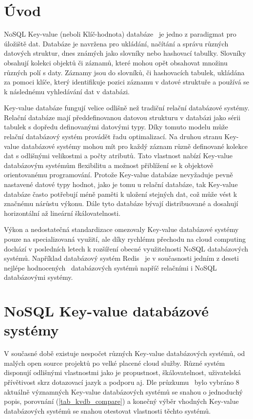 \documentclass[czech,master,dept460,male,csharp,cpdeclaration]{diploma}
\begin{document}
	
	\MakeTitlePages
	
	\chapter{Úvod}
	
	NoSQL Key-value (neboli Klíč-hodnota) databáze~\cite{wiki-key-value-db, ytb-nosql-db} je jedno z paradigmat pro úložiště dat. Databáze je navržena pro ukládání, načítání a správu různých datových struktur, dnes známých jako slovníky nebo hashovací tabulky. Slovníky obsahují kolekci objektů či záznamů, které mohou opět obsahovat množinu různých polí s daty. Záznamy jsou do slovníků, či hashovacích tabulek, ukládána za pomoci klíče, který identifikuje pozici záznamu v datové struktuře a používá se k následnému vyhledávání dat v databázi.
	
	Key-value databáze fungují velice odlišně než tradiční relační databázové systémy. Relační databáze mají předdefinovanou datovou strukturu v databázi jako sérii tabulek s dopředu definovanými datovými typy. Díky tomuto modelu může relační databázový systém provádět řadu optimalizací. Na druhou stranu Key-value databázové systémy mohou mít pro každý záznam různě definované kolekce dat s odlišnými velikostmi a počty atributů. Tato vlastnost nabízí Key-value databázovým systémům flexibilitu a možnost přiblížení se k objektově orientovanému programování. Protože Key-value databáze nevyžaduje pevně nastavené datové typy hodnot, jako je tomu u relační databáze, tak Key-value databáze často potřebují méně paměti k uložení stejných dat, což může vést k značnému nárůstu výkonu. Dále tyto databáze bývají distribuované a dosahují horizontální až lineární škálovatelnosti.
	
	Výkon a nedostatečná standardizace omezovaly Key-value databázové systémy pouze na specializovaná využití, ale díky rychlému přechodu na cloud computing dochází v posledních letech k rozšíření obecné využitelnosti NoSQL databázových systémů. Například databázový systém Redis~\cite{redis} je v současnosti jedním z deseti nejlépe hodnocených~\cite{db-engineers-ranking} databázových systémů napříč relačními i NoSQL databázovými systémy.
	
	\chapter{NoSQL Key-value databázové systémy}
	\label{chapter:no-sql-ky-sys}
	
	V současné době existuje nespočet různých Key-value databázových systémů, od malých open source projektů po velké placené cloud služby. Různé systém disponují odlišnými vlastnostmi jako je propustnost, škálovatelnost, uživatelská přívětivost skrz dotazovací jazyk a podporu aj. Dle průzkumu~\cite{predictiveanalyticstoday,g2,db-engineers-ranking} bylo vybráno 8 aktuálně významných Key-value databázových systémů se snahou o jednoduchý popis, porovnání (\ref{tab_kvdb_compare}) a konečný výběr vhodných Key-value databázových systémů se snahou otestovat vlastnosti těchto systémů.
	
\end{document}
